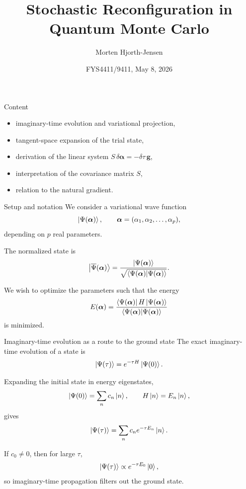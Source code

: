 \documentclass[aspectratio=169]{beamer}
\title{Stochastic Reconfiguration in Quantum Monte Carlo}
\author{Morten Hjorth-Jensen}
\date{FYS4411/9411, May 8, 2026}
\begin{document}
\frame{\titlepage}

\begin{frame}{Content}
\begin{itemize}
\item imaginary-time evolution and variational projection,
\item tangent-space expansion of the trial state,
\item derivation of the linear system \(S \, \delta \bm{\alpha} = -\delta\tau \, \bm{g}\),
\item interpretation of the covariance matrix \(S\),
\item relation to the natural gradient.
\end{itemize}
\end{frame}

\begin{frame}{Setup and notation}
We consider a variational wave function
\[
\ket{\Psi(\bm{\alpha})},
\qquad
\bm{\alpha}=(\alpha_1,\alpha_2,\dots,\alpha_p),
\]
depending on \(p\) real parameters.

\medskip

The normalized state is
\[
\ket{\overline{\Psi}(\bm{\alpha})}
=
\frac{\ket{\Psi(\bm{\alpha})}}
{\sqrt{\braket{\Psi(\bm{\alpha})}{\Psi(\bm{\alpha})}}}.
\]

We wish to optimize the parameters such that the energy
\[
E(\bm{\alpha})
=
\frac{\bra{\Psi(\bm{\alpha})}H\ket{\Psi(\bm{\alpha})}}
{\braket{\Psi(\bm{\alpha})}{\Psi(\bm{\alpha})}}
\]
is minimized.
\end{frame}

\begin{frame}{Imaginary-time evolution as a route to the ground state}
The exact imaginary-time evolution of a state is
\[
\ket{\Psi(\tau)}
=
e^{-\tau H}\ket{\Psi(0)}.
\]

Expanding the initial state in energy eigenstates,
\[
\ket{\Psi(0)}=\sum_n c_n \ket{n},
\qquad
H\ket{n}=E_n\ket{n},
\]
gives
\[
\ket{\Psi(\tau)}
=
\sum_n c_n e^{-\tau E_n}\ket{n}.
\]

If \(c_0\neq 0\), then for large \(\tau\),
\[
\ket{\Psi(\tau)} \propto e^{-\tau E_0}\ket{0},
\]
so imaginary-time propagation filters out the ground state.
\end{frame}
\end{document}
